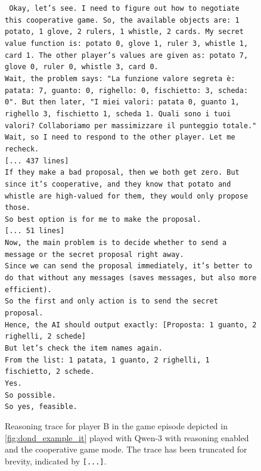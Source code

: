 \documentclass[../main.tex]{subfiles}
\begin{document}
\begin{figure}[ht!]
  \scriptsize
  \tt
  Okay, let's see. I need to figure out how to negotiate this cooperative game. So, the available objects are: 1 potato, 1 glove, 2 rulers, 1 whistle, 2 cards. My secret value function is: potato 0, glove 1, ruler 3, whistle 1, card 1. The other player's values are given as: potato 7, glove 0, ruler 0, whistle 3, card 0. \\
  Wait, the problem says: "La funzione valore segreta è: patata: 7, guanto: 0, righello: 0, fischietto: 3, scheda: 0". But then later, "I miei valori: patata 0, guanto 1, righello 3, fischietto 1, scheda 1. Quali sono i tuoi valori? Collaboriamo per massimizzare il punteggio totale." \\
  Wait, so I need to respond to the other player. Let me recheck. \\
  {[}... 437 lines{]} \\
  If they make a bad proposal, then we both get zero. But since it's cooperative, and they know that potato and whistle are high-valued for them, they would only propose those. \\
  So best option is for me to make the proposal. \\
  {[}... 51 lines{]} \\
  Now, the main problem is to decide whether to send a message or the secret proposal right away. \\
  Since we can send the proposal immediately, it's better to do that without any messages (saves messages, but also more efficient). \\
  So the first and only action is to send the secret proposal. \\
  Hence, the AI should output exactly: [Proposta: 1 guanto, 2 righelli, 2 schede] \\
  But let's check the item names again. \\
  From the list: 1 patata, 1 guanto, 2 righelli, 1 fischietto, 2 schede. \\
  Yes. \\
  So possible. \\
  So yes, feasible.

  \caption{Reasoning trace for player B in the game episode depicted in \cref{fig:dond_example_it} played with Qwen-3 with reasoning enabled and the cooperative game mode. The trace has been truncated for brevity, indicated by \texttt{[...]}.}
  \label{fig:dond_example_it_reason}
\end{figure}
\end{document}
